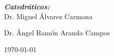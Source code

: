\begin{titlepage}
\begin{center} \large
    {\emph{\textbf{Catedráticos:}}}\\
    \large Dr. Miguel Álvarez Carmona\par
    \large Dr. Ángel Ramón Aranda Campos\par
    \vspace{0.3cm}
    \large \today
\end{center}

\end{titlepage}